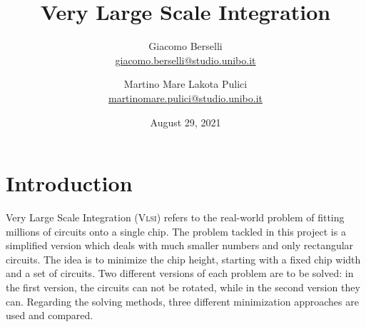 \documentclass[a4paper, 12pt]{article}
\begin{document}
\title{Very Large Scale Integration}
\author{Giacomo Berselli \\ \small{\href{mailto:giacomo.berselli@studio.unibo.it}{giacomo.berselli@studio.unibo.it}} \and
    Martino Mare Lakota Pulici \\ \small{\href{mailto:martinomare.pulici@studio.unibo.it}{martinomare.pulici@studio.unibo.it}}}
\date{August 29, 2021}
\maketitle
\begin{center}
\end{center}


\clearpage


\tableofcontents


\clearpage


\listoffigures


\clearpage


\section{Introduction}

Very Large Scale Integration (\textsc{Vlsi}) refers to the real-world problem of fitting millions of circuits onto a single chip. The problem tackled in this project is a simplified version which deals with much smaller numbers and only rectangular circuits. The idea is to minimize the chip height, starting with a fixed chip width and a set of circuits. Two different versions of each problem are to be solved: in the first version, the circuits can not be rotated, while in the second version they can. Regarding the solving methods, three different minimization approaches are used and compared.
\end{document}
